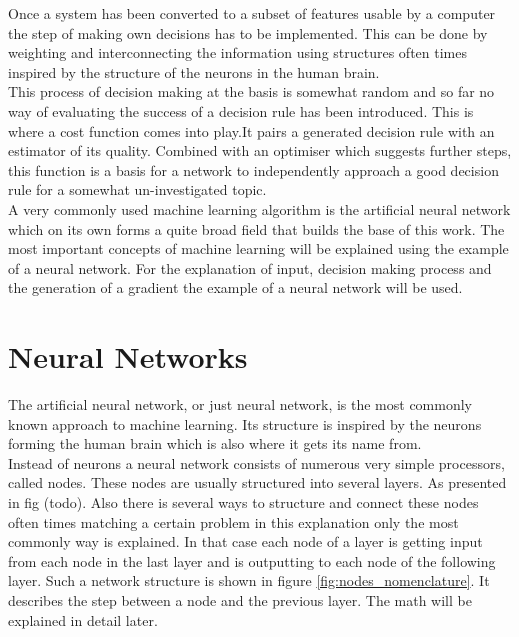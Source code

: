 Once a system has been converted to a subset of features usable by a computer the step of making own decisions has to be implemented. This can be done by weighting and interconnecting the information using structures often times inspired by the structure of the neurons in the human brain.\\
This process of decision making at the basis is somewhat random and so far no way of evaluating the success of a decision rule has been introduced. This is where a cost function comes into play.It pairs a generated decision rule with an estimator of its quality. Combined with an optimiser which suggests further steps, this function is a basis for a network to independently approach a good decision rule for a somewhat un-investigated topic.\\
A very commonly used machine learning algorithm is the artificial neural network which on its own forms a quite broad field that builds the base of this work. The most important concepts of machine learning will be explained using the example of a neural network. For the explanation of input, decision making process and the generation of a gradient the example of a neural network will be used.

\section{Neural Networks}

The artificial neural network, or just neural network, is the most commonly known approach to machine learning. Its structure is inspired by the neurons forming the human brain which is also where it gets its name from.\\
Instead of neurons a neural network consists of numerous very simple processors, called nodes. These nodes are usually structured into several layers. As presented in fig (todo). Also there is several ways to structure and connect these nodes often times matching a certain problem in this explanation only the most commonly way is explained. In that case each node of a layer is getting input from each node in the last layer and is outputting to each node of the following layer. Such a network structure is shown in figure \ref{fig:nodes_nomenclature}. It describes the step between a node and the previous layer. The math will be explained in detail later.

